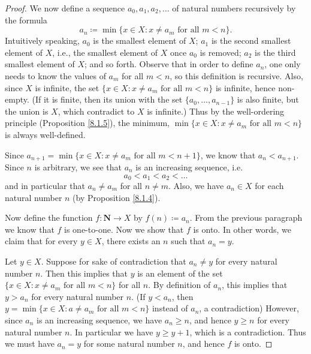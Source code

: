 \begin{proof}
    We now define a sequence \(a_0, a_1, a_2, \dots\) of natural numbers recursively by the formula
    \[
        a_n \coloneqq \min\{x \in X : x \neq a_m \text{ for all } m < n\}.
    \]
    Intuitively speaking, \(a_0\) is the smallest element of \(X\);
    \(a_1\) is the second smallest element of \(X\), i.e., the smallest element of \(X\) once \(a_0\) is removed;
    \(a_2\) is the third smallest element of \(X\);
    and so forth.
    Observe that in order to define \(a_n\), one only needs to know the values of \(a_m\) for all \(m < n\), so this definition is recursive.
    Also, since \(X\) is infinite, the set \(\{x \in X : x \neq a_m \text{ for all } m < n\}\) is infinite, hence non-empty.
    (If it is finite, then its union with the set \(\{a_0, \dots, a_{n - 1}\}\) is also finite, but the union is \(X\), which contradict to \(X\) is infinite.)
    Thus by the well-ordering principle (Proposition \ref{8.1.5}), the minimum, \(\min\{x \in X : x \neq a_m \text{ for all } m < n\}\) is always well-defined.

    Since \(a_{n + 1} = \min\{x \in X : x \neq a_m \text{ for all } m < n + 1\}\), we know that \(a_n < a_{n + 1}\).
    Since \(n\) is arbitrary, we see that \(a_n\) is an increasing sequence, i.e.
    \[
        a_0 < a_1 < a_2 < \dots
    \]
    and in particular that \(a_n \neq a_m\) for all \(n \neq m\).
    Also, we have \(a_n \in X\) for each natural number \(n\) (by Proposition \ref{8.1.4}).

    Now define the function \(f : \mathbf{N} \to X\) by \(f(n) \coloneqq a_n\).
    From the previous paragraph we know that \(f\) is one-to-one.
    Now we show that \(f\) is onto.
    In other words, we claim that for every \(y \in X\), there exists an \(n\) such that \(a_n = y\).

    Let \(y \in X\).
    Suppose for sake of contradiction that \(a_n \neq y\) for every natural number \(n\).
    Then this implies that \(y\) is an element of the set \(\{x \in X : x \neq a_m \text{ for all } m < n\}\) for all \(n\).
    By definition of \(a_n\), this implies that \(y > a_n\) for every natural number \(n\).
    (If \(y < a_n\), then \(y = \min\{x \in X : a \neq a_m \text{ for all } m < n\}\) instead of \(a_n\), a contradiction)
    However, since \(a_n\) is an increasing sequence, we have \(a_n \geq n\), and hence \(y \geq n\) for every natural number \(n\).
    In particular we have \(y \geq y + 1\), which is a contradiction.
    Thus we must have \(a_n = y\) for some natural number \(n\), and hence \(f\) is onto.


\end{proof}
